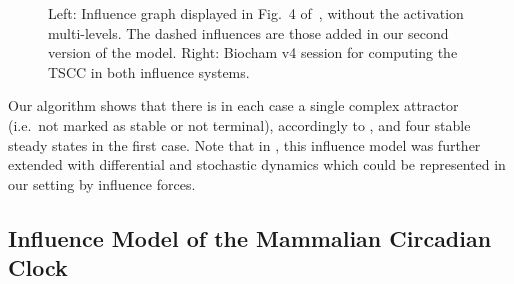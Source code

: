 \documentclass{llncs}
\begin{document}
\begin{figure}[htb]
\begin{center}
   \begin{minipage}[r]{.45\textwidth}
      \begin{center}
      \end{center}
   \end{minipage}
   \begin{minipage}[c]{.3\textwidth}
   \end{minipage}
   \begin{minipage}[l]{.5\textwidth}
      
   \end{minipage}\hfill
\end{center}
\caption{{Left:} Influence graph displayed in Fig.~4 of~\cite{AOK09jtb}, without the
      activation multi-levels.
      The dashed influences are those added in our second version of the
      model.
{Right:} Biocham v4 session for computing the TSCC in both influence systems.} \label{p53}
\end{figure}


   Our algorithm shows that there is in each case a single complex attractor (i.e.~not marked as stable or not terminal),
   accordingly to \cite{AOK09jtb}, and four
   stable steady states in the first case.
   Note that in \cite{OAK10jtb}, this influence model was further extended with differential and stochastic dynamics
   which could be represented in our setting by influence forces.

\subsection{Influence Model of the Mammalian Circadian Clock~\cite{CBDDMC12pcs}}
\end{document}
